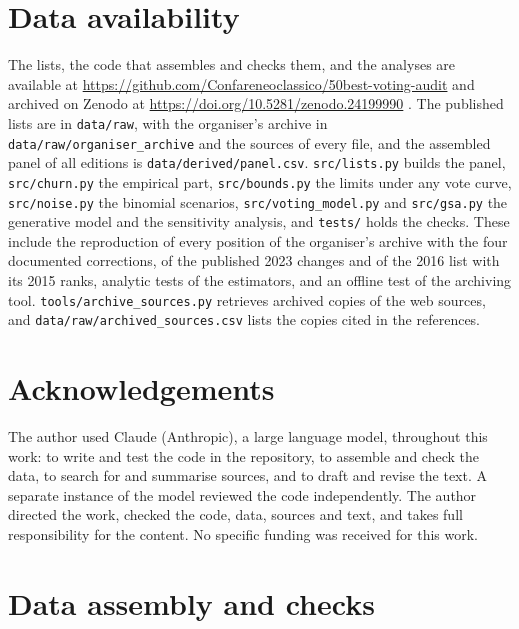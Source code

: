 \documentclass[11pt,a4paper]{article}
\begin{document}
\section*{Data availability}

The lists, the code that assembles and checks them, and the analyses are available at \url{https://github.com/Confareneoclassico/50best-voting-audit} and archived on Zenodo at \url{https://doi.org/10.5281/zenodo.24199990} \citep{lopiano2026code}. The published lists are in \texttt{data/raw}, with the organiser's archive in \texttt{data/raw/organiser\_archive} and the sources of every file, and the assembled panel of all editions is \texttt{data/derived/panel.csv}. \texttt{src/lists.py} builds the panel, \texttt{src/churn.py} the empirical part, \texttt{src/bounds.py} the limits under any vote curve, \texttt{src/noise.py} the binomial scenarios, \texttt{src/voting\_model.py} and \texttt{src/gsa.py} the generative model and the sensitivity analysis, and \texttt{tests/} holds the checks. These include the reproduction of every position of the organiser's archive with the four documented corrections, of the published 2023 changes and of the 2016 list with its 2015 ranks, analytic tests of the estimators, and an offline test of the archiving tool. \texttt{tools/archive\_sources.py} retrieves archived copies of the web sources, and \texttt{data/raw/archived\_sources.csv} lists the copies cited in the references.

\section*{Acknowledgements}

The author used Claude (Anthropic), a large language model, throughout this work: to write and test the code in the repository, to assemble and check the data, to search for and summarise sources, and to draft and revise the text. A separate instance of the model reviewed the code independently. The author directed the work, checked the code, data, sources and text, and takes full responsibility for the content. No specific funding was received for this work.




\appendix
\section{Data assembly and checks}\label{app:data}
\end{document}
